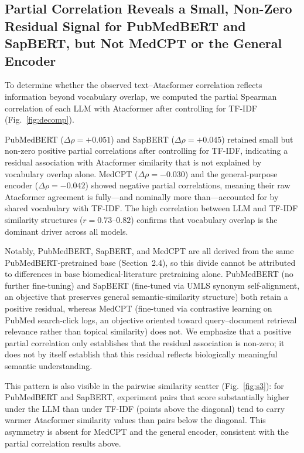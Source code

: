 \documentclass[conference]{IEEEtran}
\begin{document}
\FloatBarrier
\subsection{Partial Correlation Reveals a Small, Non-Zero Residual Signal for
PubMedBERT and SapBERT, but Not MedCPT or the General Encoder}

To determine whether the observed text--Atacformer correlation reflects
information beyond vocabulary overlap, we computed the partial Spearman
correlation of each LLM with Atacformer after controlling for TF-IDF
(Fig.~\ref{fig:decomp}).

PubMedBERT ($\Delta\rho = +0.051$) and SapBERT ($\Delta\rho = +0.045$)
retained small but non-zero positive partial correlations after controlling
for TF-IDF, indicating a residual association with Atacformer similarity that
is not explained by vocabulary overlap alone. MedCPT ($\Delta\rho = -0.030$)
and the general-purpose encoder ($\Delta\rho = -0.042$) showed negative
partial correlations, meaning their raw Atacformer agreement is fully---and
nominally more than---accounted for by shared vocabulary with TF-IDF. The high
correlation between LLM and TF-IDF similarity structures ($r = 0.73$--$0.82$)
confirms that vocabulary overlap is the dominant driver across all models.

Notably, PubMedBERT, SapBERT, and MedCPT are all derived from the same
PubMedBERT-pretrained base (Section~2.4), so this divide cannot be attributed
to differences in base biomedical-literature pretraining alone. PubMedBERT
(no further fine-tuning) and SapBERT (fine-tuned via UMLS synonym
self-alignment, an objective that preserves general semantic-similarity
structure) both retain a positive residual, whereas MedCPT (fine-tuned via
contrastive learning on PubMed search-click logs, an objective oriented toward
query--document retrieval relevance rather than topical similarity) does not.
We emphasize that a positive partial correlation only establishes that the
residual association is non-zero; it does not by itself establish that this
residual reflects biologically meaningful semantic understanding.

This pattern is also visible in the pairwise similarity scatter
(Fig.~\ref{fig:s3}): for PubMedBERT and SapBERT, experiment pairs that score
substantially higher under the LLM than under TF-IDF (points above the
diagonal) tend to carry warmer Atacformer similarity values than pairs below
the diagonal. This asymmetry is absent for MedCPT and the general encoder,
consistent with the partial correlation results above.
\end{document}
